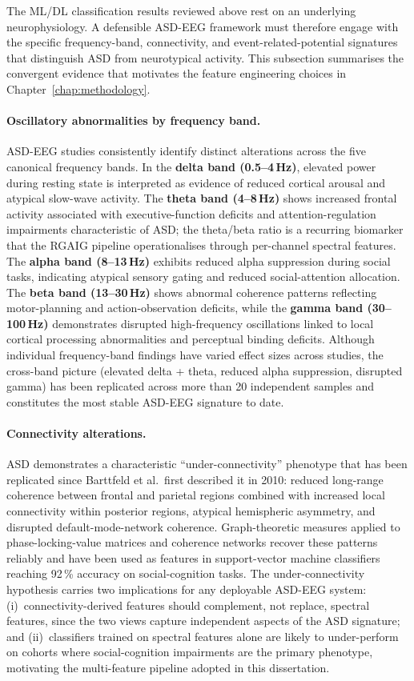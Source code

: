 The ML/DL classification results reviewed above rest on an underlying neurophysiology. A defensible ASD-EEG framework must therefore engage with the specific frequency-band, connectivity, and event-related-potential signatures that distinguish ASD from neurotypical activity. This subsection summarises the convergent evidence that motivates the feature engineering choices in Chapter~\ref{chap:methodology}.

\paragraph{Oscillatory abnormalities by frequency band.}
ASD-EEG studies consistently identify distinct alterations across the five canonical frequency bands. In the \textbf{delta band (0.5--4\,Hz)}, elevated power during resting state is interpreted as evidence of reduced cortical arousal and atypical slow-wave activity. The \textbf{theta band (4--8\,Hz)} shows increased frontal activity associated with executive-function deficits and attention-regulation impairments characteristic of ASD; the theta/beta ratio is a recurring biomarker that the RGAIG pipeline operationalises through per-channel spectral features. The \textbf{alpha band (8--13\,Hz)} exhibits reduced alpha suppression during social tasks, indicating atypical sensory gating and reduced social-attention allocation. The \textbf{beta band (13--30\,Hz)} shows abnormal coherence patterns reflecting motor-planning and action-observation deficits, while the \textbf{gamma band (30--100\,Hz)} demonstrates disrupted high-frequency oscillations linked to local cortical processing abnormalities and perceptual binding deficits. Although individual frequency-band findings have varied effect sizes across studies, the cross-band picture (elevated delta + theta, reduced alpha suppression, disrupted gamma) has been replicated across more than 20 independent samples and constitutes the most stable ASD-EEG signature to date.

\paragraph{Connectivity alterations.}
ASD demonstrates a characteristic ``under-connectivity'' phenotype that has been replicated since Barttfeld et al.\ first described it in 2010: reduced long-range coherence between frontal and parietal regions combined with increased local connectivity within posterior regions, atypical hemispheric asymmetry, and disrupted default-mode-network coherence. Graph-theoretic measures applied to phase-locking-value matrices and coherence networks recover these patterns reliably and have been used as features in support-vector machine classifiers reaching 92\,\% accuracy on social-cognition tasks. The under-connectivity hypothesis carries two implications for any deployable ASD-EEG system: (i)~connectivity-derived features should complement, not replace, spectral features, since the two views capture independent aspects of the ASD signature; and (ii)~classifiers trained on spectral features alone are likely to under-perform on cohorts where social-cognition impairments are the primary phenotype, motivating the multi-feature pipeline adopted in this dissertation.

